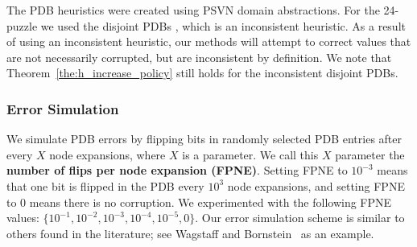 \documentclass[letterpaper]{article}
\newcommand{\roni}[1]{\mbox{\tt RONI: #1}}
\begin{document}

The PDB heuristics were created using PSVN domain abstractions. %
%
For the 24-puzzle we used the disjoint PDBs 
\cite{korf2002disjointPatternDatabase}, which is an inconsistent heuristic. As a result of using an inconsistent heuristic, our methods will attempt to correct values that are not necessarily corrupted, but are inconsistent by definition. We note that Theorem~\ref{the:h_increase_policy} still holds for the inconsistent disjoint PDBs. %



\subsubsection{Error Simulation}


We simulate PDB errors by flipping bits in randomly selected PDB entries after every $X$ node expansions, where $X$ is a parameter. We call this $X$ parameter the \textbf{number of flips per node expansion (FPNE)}. Setting FPNE to $10^{-3}$ means that one bit is flipped in the PDB every $10^{3}$ node expansions, and setting FPNE to $0$ means there is no corruption. We experimented with the following FPNE values: 
$\{10^{-1},10^{-2}, 10^{-3}, 10^{-4}, 10^{-5}, 0\}$. 
Our error simulation scheme is similar to others found in the literature; see Wagstaff and Bornstein~ as an example. 


\end{document}
